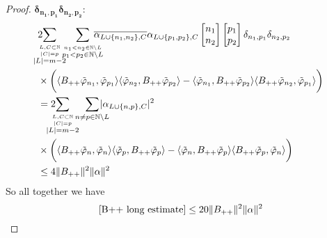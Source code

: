 \documentclass[b5paper,draft,openbib,12pt]{memoir}
\begin{document}
\begin{proof}
\(\boldsymbol{\delta_{n_1,p_1}\delta_{n_2,p_2}:}\)
\begin{align}
&2\hspace{-0.4cm}\sum_{\overset{L,C\subset \mathbb{N}}{\overset{|C|=p}{|L|=m-2}}}\hspace{-0.2cm}\sum_{\overset{n_1<n_2\in\mathbb{N}\backslash L }{p_1<p_2\in\mathbb{N}\backslash L }}
\hspace{-0.4cm}\overline{\alpha_{L\cup\{n_1,n_2\},C}}\alpha_{L\cup\{p_1,p_2\},C}
\left[\begin{matrix}n_1\\n_2\end{matrix}\right]\left[\begin{matrix}p_1\\p_2\end{matrix}\right]\delta_{n_1,p_1}\delta_{n_2,p_2}\\
&\times \bigg(
\langle B_{++}\tilde{\varphi}_{n_1},\tilde{\varphi}_{p_1} \rangle \langle  \tilde{\varphi}_{n_2}, B_{++}\tilde{\varphi}_{p_2}\rangle
-\langle \tilde{\varphi}_{n_1},B_{++}\tilde{\varphi}_{p_2} \rangle \langle B_{++} \tilde{\varphi}_{n_2}, \tilde{\varphi}_{p_1}\rangle\bigg)\\
&=2\hspace{-0.4cm}\sum_{\overset{L,C\subset \mathbb{N}}{\overset{|C|=p}{|L|=m-2}}}\hspace{-0.2cm}\sum_{n\neq p\in\mathbb{N}\backslash L }
\hspace{-0.4cm}|\alpha_{L\cup\{n,p\},C}|^2\\
&\times \bigg(
\langle B_{++}\tilde{\varphi}_{n},\tilde{\varphi}_{n} \rangle \langle  \tilde{\varphi}_{p}, B_{++}\tilde{\varphi}_{p}\rangle
-\langle \tilde{\varphi}_{n},B_{++}\tilde{\varphi}_{p} \rangle \langle B_{++} \tilde{\varphi}_{p}, \tilde{\varphi}_{n}\rangle\bigg)\\
&\le 4 \|B_{++}\|^2 \|\alpha\|^2
\end{align}
So all together we have 
\begin{equation}\label{B++ long estimate final}
  \eqref{B++ long estimate}\le 20 \|B_{++}\|^2 \|\alpha\|^2
\end{equation}


\end{proof}
\end{document}
